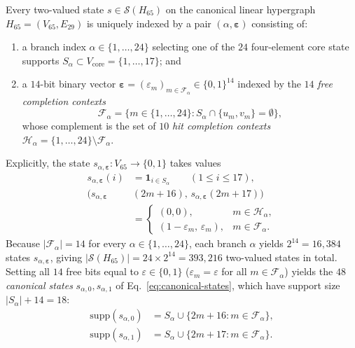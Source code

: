 \documentclass[
  aps,
  pra,
  reprint,
  superscriptaddress,
  amsmath,
  amssymb,
  nofootinbib,
  floatfix
]{revtex4-2}
\theoremstyle{definition}
\theoremstyle{remark}
\begin{document}
Every two-valued state $s\in\mathcal{S}(H_{65})$ on the canonical linear hypergraph $H_{65}=(V_{65},E_{29})$ is uniquely indexed by a pair $(\alpha,\bm{\varepsilon})$ consisting of:
\begin{enumerate}
\item a branch index $\alpha\in\{1,\ldots,24\}$ selecting one of the $24$ four-element core state supports $S_\alpha\subset V_{\mathrm{core}}=\{1,\ldots,17\}$; and
\item a $14$-bit binary vector $\bm{\varepsilon}=(\varepsilon_m)_{m\in \mathcal{F}_\alpha}\in\{0,1\}^{14}$ indexed by the $14$ \emph{free completion contexts}
\begin{equation*}
\mathcal{F}_\alpha=\bigl\{m\in\{1,\ldots,24\} : S_\alpha\cap\{u_m,v_m\}=\emptyset\bigr\},
\end{equation*}
whose complement is the set of $10$ \emph{hit completion contexts} $\mathcal{H}_\alpha=\{1,\ldots,24\}\setminus \mathcal{F}_\alpha$.
\end{enumerate}
Explicitly, the state $s_{\alpha,\bm{\varepsilon}}:V_{65}\to\{0,1\}$ takes values
\begin{equation}\label{eq:full-state-param}
\begin{aligned}
s_{\alpha,\bm{\varepsilon}}(i)&=\mathbf{1}_{i\in S_\alpha}\qquad(1\le i\le 17),\\
\bigl(s_{\alpha,\bm{\varepsilon}}&(2m+16),\,s_{\alpha,\bm{\varepsilon}}(2m+17)\bigr)\\
&=\begin{cases}
(0,0), & m\in \mathcal{H}_\alpha,\\
(1-\varepsilon_m,\,\varepsilon_m), & m\in \mathcal{F}_\alpha.
\end{cases}
\end{aligned}
\end{equation}
Because $|\mathcal{F}_\alpha|=14$ for every $\alpha\in\{1,\ldots,24\}$, each branch $\alpha$ yields $2^{14}=16{,}384$ states $s_{\alpha,\bm{\varepsilon}}$, giving $|\mathcal{S}(H_{65})|=24\times 2^{14}=393{,}216$ two-valued states in total. Setting all $14$ free bits equal to $\varepsilon\in\{0,1\}$ ($\varepsilon_m=\varepsilon$ for all $m\in \mathcal{F}_\alpha$) yields the $48$ \emph{canonical states} $s_{\alpha,0},s_{\alpha,1}$ of Eq.~\eqref{eq:canonical-states}, which have support size $|S_\alpha|+14=18$:
\begin{equation}\label{eq:canonical-state-supports}
\begin{aligned}
\mathrm{supp}(s_{\alpha,0}) &= S_\alpha \cup \bigl\{2m+16 : m\in \mathcal{F}_\alpha\bigr\},\\
\mathrm{supp}(s_{\alpha,1}) &= S_\alpha \cup \bigl\{2m+17 : m\in \mathcal{F}_\alpha\bigr\}.
\end{aligned}
\end{equation}
\end{document}
